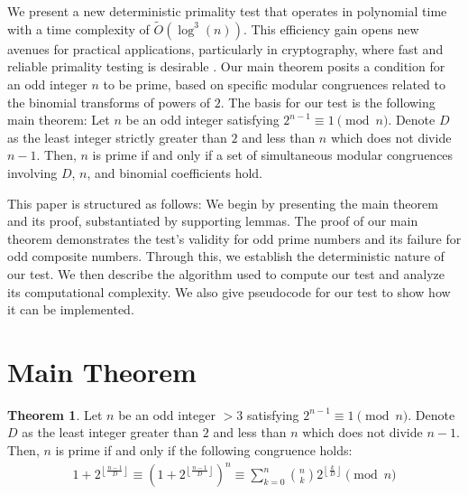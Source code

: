 \documentclass{article}
\theoremstyle{plain}
\theoremstyle{definition}
\newtheorem{theorem}{Theorem}
\begin{document}
We present a new deterministic primality test that operates in polynomial time with a time complexity of $\tilde{O}(\log^3(n))$. This efficiency gain opens new avenues for practical applications, particularly in cryptography, where fast and reliable primality testing is desirable \cite{pomerance1984}. Our main theorem posits a condition for an odd integer \( n \) to be prime, based on specific modular congruences related to the binomial transforms of powers of $2$. The basis for our test is the following main theorem: Let \( n \) be an odd integer satisfying \( 2^{n-1} \equiv 1 \pmod{n} \). Denote \( D \) as the least integer strictly greater than \( 2 \) and less than \( n \) which does not divide \( n-1 \). Then, \( n \) is prime if and only if a set of simultaneous modular congruences involving \( D \), \( n \), and binomial coefficients hold.

This paper is structured as follows: We begin by presenting the main theorem and its proof, substantiated by supporting lemmas. The proof of our main theorem demonstrates the test's validity for odd prime numbers and its failure for odd composite numbers. Through this, we establish the deterministic nature of our test. We then describe the algorithm used to compute our test and analyze its computational complexity. We also give pseudocode for our test to show how it can be implemented.

\section{Main Theorem}

\begin{theorem}
\label{theorem:1}
    Let $n$ be an odd integer $> 3$ satisfying $2^{n-1} \equiv 1 \pmod{n}$. Denote $D$ as the least integer greater than $2$ and less than $n$ which does not divide $n-1$. Then, $n$ is prime if and only if the following congruence holds:
    \begin{align}
        1 + 2^{\left\lfloor \frac{n-1}{D} \right\rfloor} \equiv \left(1 + 2^{\left\lfloor \frac{n-1}{D} \right\rfloor}\right)^{n} \equiv \sum_{k=0}^{n} \binom{n}{k} 2^{\left\lfloor \frac{k}{D} \right\rfloor} \pmod{n}
    \end{align}
\end{theorem}
\end{document}

